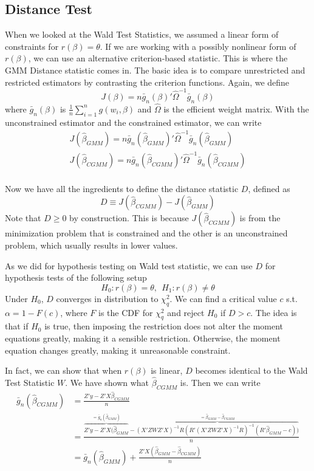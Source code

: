 \documentclass[12pt]{article}
\theoremstyle{definition}
\theoremstyle{property}
\theoremstyle{assumption}
\theoremstyle{example}
\theoremstyle{comment}
\begin{document}
\subsection{Distance Test}
When we looked at the Wald Test Statistics, we assumed a linear form of constraints for $r(\beta)=\theta$. If we are working with a possibly nonlinear form of $r(\beta)$, we can use an alternative criterion-based statistic. This is where the GMM Distance statistic comes in. The basic idea is to compare unrestricted and restricted estimators by contrasting the criterion functions. Again, we define
\[
J(\beta)=n\bar{g}_n(\beta)'\widehat{\Omega}^{-1}\bar{g}_n(\beta)
\]
where $\bar{g}_n(\beta)$ is $\frac{1}{n}\sum_{i=1}^n g(w_i,\beta)$ and $\widehat{\Omega}$ is the efficient weight matrix. With the unconstrained estimator and the constrained estimator, we can write
\begin{gather*}
J(\hat{\beta}_{GMM})=n\bar{g}_n(\hat{\beta}_{GMM})'\widehat{\Omega}^{-1}\bar{g}_n(\hat{\beta}_{GMM})\\
J(\hat{\beta}_{CGMM})=n\bar{g}_n(\hat{\beta}_{CGMM})'\widehat{\Omega}^{-1}\bar{g}_n(\hat{\beta}_{CGMM})\\
\end{gather*}\par
Now we have all the ingredients to define the distance statistic $D$, defined as
\[
D\equiv J(\hat{\beta}_{CGMM})-J(\hat{\beta}_{GMM})
\]
Note that $D\geq0$ by construction. This is because $J(\hat{\beta}_{CGMM})$ is from the minimization problem that is constrained and the other is an unconstrained problem, which usually results in lower values.\par
As we did for hypothesis testing on Wald test statistic, we can use $D$ for hypothesis tests of the following setup
\[
H_0: r(\beta)=\theta, \ \ H_1: r(\beta)\neq \theta
\]
Under $H_0$, $D$ converges in distribution to $\chi_q^2$. We can find a critical value $c$ s.t. $\alpha = 1-F(c)$, where $F$ is the CDF for $\chi_q^2$ and reject $H_0$ if $D>c$. The idea is that if $H_0$ is true, then imposing the restriction does not alter the moment equations greatly, making it a sensible restriction. Otherwise, the moment equation changes greatly, making it unreasonable constraint. \par
\par
 In fact, we can show that when $r(\beta)$ is linear, $D$ becomes identical to the Wald Test Statistic $W$. We have shown what $\hat{\beta}_{CGMM}$ is. Then we can write 
 \[
 \begin{aligned}
 \bar{g}_n(\hat{\beta}_{CGMM})&=\frac{Z'y-Z'X\hat{\beta}_{CGMM}}{n}\\
 & =\frac{\overbrace{Z'y-Z'X(\hat{\beta}_{GMM}}^{=\bar{g}_n(\hat{\beta}_{GMM})}-\overbrace{(X'ZWZ'X)^{-1}R(R'(X'ZWZ'X)^{-1}R)^{-1}(R'\hat{\beta}_{GMM}-c))}^{=\hat{\beta}_{GMM}-\hat{\beta}_{CGMM}}}{n}\\
 &=\bar{g}_n(\hat{\beta}_{GMM})+\frac{Z'X(\hat{\beta}_{GMM}-\hat{\beta}_{
 CGMM})}{n}\\
 \end{aligned}
 \]
\end{document}
